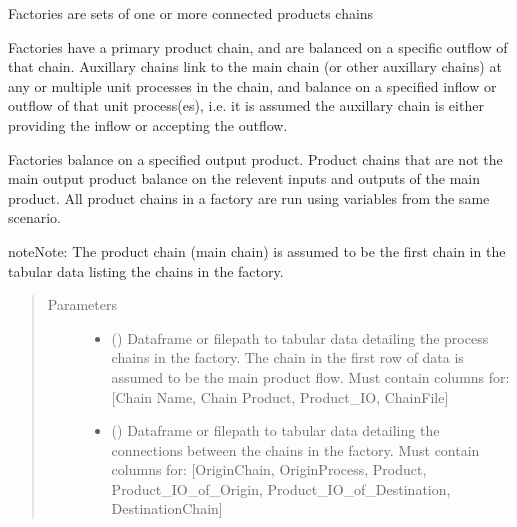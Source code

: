 \documentclass[a4paper,10pt,english]{sphinxmanual}
\begin{document}
\begin{fulllineitems}
\label{\detokenize{factory:factory.Factory}}
Factories are sets of one or more connected products chains

Factories have a primary product chain, and are balanced on a specific
outflow of that chain. Auxillary chains link to the main chain (or other
auxillary chains) at any or multiple unit processes in the chain, and
balance on a specified inflow or outflow of that unit process(es), i.e.
it is assumed the auxillary chain is either providing the inflow or
accepting the outflow.

Factories balance on a specified output product. Product chains that
are not the main output product balance on the relevent inputs and
outputs of the main product. All product chains in a factory are run
using variables from the same scenario.

\begin{sphinxadmonition}{note}{Note:}
The product chain (main chain) is assumed to be the first chain
in the tabular data listing the chains in the factory.
\end{sphinxadmonition}
\begin{quote}\begin{description}
\item[{Parameters}] \leavevmode\begin{itemize}
\item {} 
 () \textendash{} Dataframe or filepath to tabular data
detailing the process chains in the factory. The chain in the first
row of data is assumed to be the main product flow.
Must contain columns for:
{[}Chain Name, Chain Product, Product\_IO, ChainFile{]}

\item {} 
 () \textendash{} Dataframe or filepath to tabular data
detailing the connections between the chains in the factory.
Must contain columns for:
{[}OriginChain, OriginProcess, Product, Product\_IO\_of\_Origin,
Product\_IO\_of\_Destination, DestinationChain{]}


\end{itemize}
\end{description}
\end{quote}
\end{fulllineitems}
\end{document}
